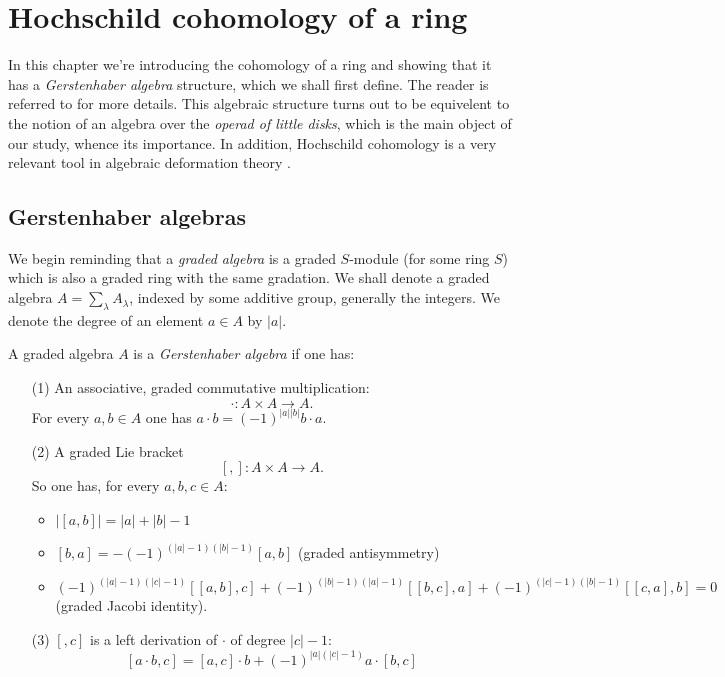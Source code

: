 \documentclass[TFM.tex]{subfiles}
\begin{document}
\chapter{Hochschild cohomology of a ring}

In this chapter we're introducing the cohomology of a ring and showing that it has a \emph{Gerstenhaber algebra} structure, which we shall first define. The reader is referred to \cite{Gerstenhaber} for more details. This algebraic structure turns out to be equivelent to the notion of an algebra over the \emph{operad of little disks}, which is the main object of our study, whence its importance. In addition, Hochschild cohomology is a very relevant tool in algebraic deformation theory \cite{deformation}.


\section{Gerstenhaber algebras}

We begin reminding that a \emph{graded algebra} is a graded $S$-module (for some ring $S$) which is also a graded ring with the same gradation. We shall denote a graded algebra $A=\sum_\lambda A_\lambda$, indexed by some additive group, generally the integers. We denote the degree of an element $a\in A$ by $|a|$. %


\begin{defi}\label{defi1}
A graded algebra $A$ is a \emph{Gerstenhaber algebra} if one has:
\begin{enumerate}
\item[(1)] An associative, graded commutative multiplication:
\[
\cdot: A\times A\to A.
\]
For every $a,b\in A$ one has $a\cdot b=(-1)^{|a||b|}b\cdot a$.

\item[(2)] A graded Lie bracket 
\[
[,]:A\times A\to A.
\]
So one has, for every $a,b,c\in A$:
\begin{itemize}
\item $|[a,b]|=|a|+|b|-1$
\item $[b,a]=-(-1)^{(|a|-1)(|b|-1)}[a,b]$ (graded antisymmetry)
\item $(-1)^{(|a|-1)(|c|-1)}[[a,b],c]+(-1)^{(|b|-1)(|a|-1)}[[b,c],a]+(-1)^{(|c|-1)(|b|-1)}[[c,a],b]=0$ (graded Jacobi identity). 
\end{itemize}
\item[(3)]  $[,c]$ is a left derivation of $\cdot$ of degree $|c|-1$: %
\[
[a\cdot b,c]=[a,c]\cdot b+(-1)^{|a|(|c|-1)}a\cdot [b,c]
\]
\end{enumerate}
\end{defi}
\end{document}
